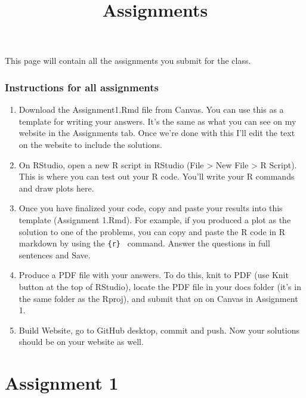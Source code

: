 \documentclass[
]{article}
\title{Assignments}
\author{}
\date{\vspace{-2.5em}}
\begin{document}
\maketitle

{
\setcounter{tocdepth}{1}
\tableofcontents
}
This page will contain all the assignments you submit for the class.

\hypertarget{instructions-for-all-assignments}{%
\subsubsection{Instructions for all
assignments}\label{instructions-for-all-assignments}}

\begin{enumerate}
\def\labelenumi{\arabic{enumi}.}
\item
  Download the Assignment1.Rmd file from Canvas. You can use this as a
  template for writing your answers. It's the same as what you can see
  on my website in the Assignments tab. Once we're done with this I'll
  edit the text on the website to include the solutions.
\item
  On RStudio, open a new R script in RStudio (File \textgreater{} New
  File \textgreater{} R Script). This is where you can test out your R
  code. You'll write your R commands and draw plots here.
\item
  Once you have finalized your code, copy and paste your results into
  this template (Assignment 1.Rmd). For example, if you produced a plot
  as the solution to one of the problems, you can copy and paste the R
  code in R markdown by using the
  \texttt{\textasciigrave{}\textasciigrave{}\{r\}\ \textasciigrave{}\textasciigrave{}\textasciigrave{}}
  command. Answer the questions in full sentences and Save.
\item
  Produce a PDF file with your answers. To do this, knit to PDF (use
  Knit button at the top of RStudio), locate the PDF file in your docs
  folder (it's in the same folder as the Rproj), and submit that on on
  Canvas in Assignment 1.
\item
  Build Website, go to GitHub desktop, commit and push. Now your
  solutions should be on your website as well.
\end{enumerate}

\hypertarget{assignment-1}{%
\section{Assignment 1}\label{assignment-1}}
\end{document}
